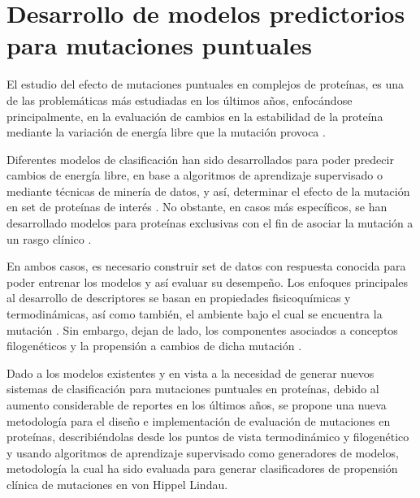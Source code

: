 
\chapter{Desarrollo de modelos predictorios para mutaciones puntuales}

\ifpdf
    \graphicspath{{Chapter2/Figs/Raster/}{Chapter2/Figs/PDF/}{Chapter2/Figs/}}
\else
    \graphicspath{{Chapter2/Figs/Vector/}{Chapter2/Figs/}}
\fi

El estudio del efecto de mutaciones puntuales en complejos de proteínas, es una de las problemáticas más estudiadas en los últimos años, enfocándose principalmente, en la evaluación de cambios en la estabilidad de la proteína mediante la variación de energía libre que la mutación provoca \cite{Schymkowitz2005,Pandurangan2017,rohl2004protein,Parthiban2006}. 

Diferentes modelos de clasificación han sido desarrollados para poder predecir cambios de energía libre, en base a algoritmos de aprendizaje supervisado o mediante técnicas de minería de datos, y así, determinar el efecto de la mutación en set de proteínas de interés \cite{Quan2016,Capriotti2008,Broom2017,Khan2010,vaisman,Getov2016,Capriotti2005}. No obstante, en casos más específicos, se han desarrollado modelos para proteínas exclusivas con el fin de asociar la mutación a un rasgo clínico \cite{article}. 

En ambos casos, es necesario construir set de datos con respuesta conocida para poder entrenar los modelos y así evaluar su desempeño. Los enfoques principales al desarrollo de descriptores se basan en propiedades fisicoquímicas y termodinámicas, así como también, el ambiente bajo el cual se encuentra la mutación \cite{Capriotti2005}. Sin embargo, dejan de lado, los componentes asociados a conceptos filogenéticos y la propensión a cambios de dicha mutación \cite{Olivera-Nappa2011}.

Dado a los modelos existentes y en vista a la necesidad de generar nuevos sistemas de clasificación para mutaciones puntuales en proteínas, debido al aumento considerable de reportes en los últimos años, se propone una nueva metodología para el diseño e implementación de evaluación de mutaciones en proteínas, describiéndolas desde los puntos de vista termodinámico y filogenético y usando algoritmos de aprendizaje supervisado como generadores de modelos, metodología la cual ha sido evaluada para generar clasificadores de propensión clínica de mutaciones en von Hippel Lindau.

